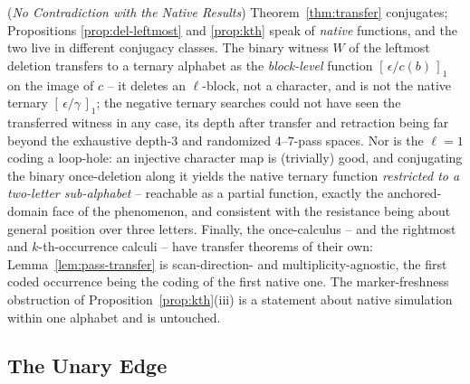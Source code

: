 \begin{remark}
    (\emph{No Contradiction with the Native Results})
    \label{rem:native}
    Theorem~\ref{thm:transfer} conjugates; Propositions
    \ref{prop:del-leftmost} and \ref{prop:kth} speak of \emph{native}
    functions, and the two live in different conjugacy classes. The binary
    witness $W$ of the leftmost deletion transfers to a ternary alphabet as
    the \emph{block-level} function $[\,\epsilon/c(b)\,]_1$ on the image of
    $c$ -- it deletes an $\ell$-block, not a character, and is not the
    native ternary $[\,\epsilon/\gamma\,]_1$; the negative ternary searches
    could not have seen the transferred witness in any case, its depth
    after transfer and retraction being far beyond the exhaustive depth-3
    and randomized $4$--$7$-pass spaces. Nor is the $\ell = 1$ coding a
    loop-hole:
    an injective character map is (trivially) good, and conjugating the
    binary once-deletion along it yields the native ternary function
    \emph{restricted to a two-letter sub-alphabet} -- reachable as a partial
    function, exactly the anchored-domain face of the phenomenon, and
    consistent with the resistance being about general position over three
    letters. Finally, the once-calculus -- and the rightmost and
    $k$-th-occurrence calculi -- have transfer theorems of their own:
    Lemma~\ref{lem:pass-transfer} is scan-direction- and
    multiplicity-agnostic, the first coded occurrence being the coding of
    the first native one. The marker-freshness obstruction of
    Proposition~\ref{prop:kth}(iii) is a statement about native simulation
    within one alphabet and is untouched.
\end{remark}

\subsection{The Unary Edge}

